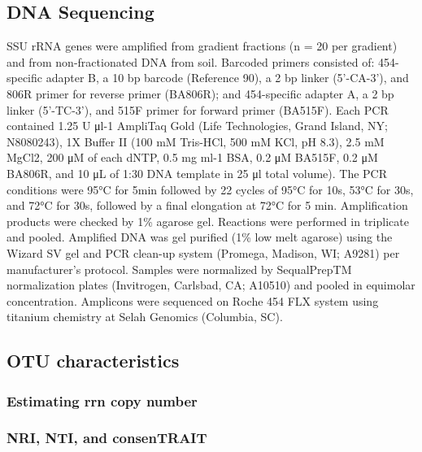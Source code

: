 \documentclass{article}
\begin{document}
\subsection{DNA Sequencing} 
SSU rRNA genes were amplified from gradient fractions (n = 20 per gradient) and
from non-fractionated DNA from soil. Barcoded primers consisted of:
454-specific adapter B, a 10 bp barcode (Reference 90), a 2 bp linker
(5’-CA-3’), and 806R primer for reverse primer (BA806R); and 454-specific
adapter A, a 2 bp linker (5’-TC-3’), and 515F primer for forward primer
(BA515F). Each PCR contained 1.25 U μl-1 AmpliTaq Gold (Life Technologies,
Grand Island, NY; N8080243), 1X Buffer II (100 mM Tris-HCl, 500 mM KCl, pH
8.3), 2.5 mM MgCl2, 200 μM of each dNTP, 0.5 mg ml-1 BSA, 0.2 μM BA515F, 0.2 μM
BA806R, and 10 μL of 1:30 DNA template in 25 μl total volume). The PCR
conditions were 95°C for 5min followed by 22 cycles of 95°C for 10s, 53°C for
30s, and 72°C for 30s, followed by a final elongation at 72°C for 5 min.
Amplification products were checked by 1\% agarose gel. Reactions were
performed in triplicate and pooled. Amplified DNA was gel purified (1\% low
melt agarose) using the Wizard SV gel and PCR clean-up system (Promega,
Madison, WI; A9281) per manufacturer’s protocol. Samples were normalized by
SequalPrepTM normalization plates (Invitrogen, Carlsbad, CA; A10510) and pooled
in equimolar concentration. Amplicons were sequenced on Roche 454 FLX system
using titanium chemistry at Selah Genomics (Columbia, SC).

\subsection{OTU characteristics} 

\subsubsection{Estimating rrn copy number}

\subsubsection{NRI, NTI, and consenTRAIT}
\end{document}
